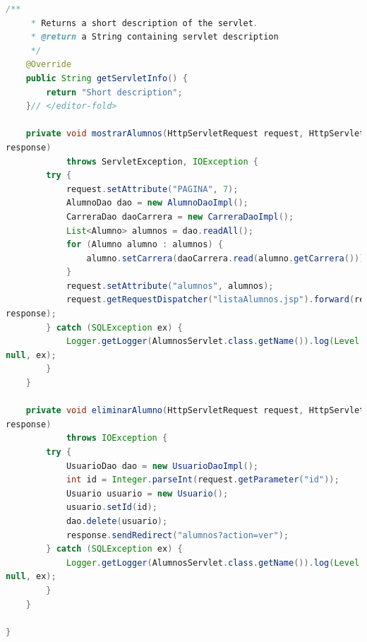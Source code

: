 \documentclass[a4paper,12pt]{article}
\begin{document}
\begin{lstlisting}[language=Java, style=customJava, 
caption={AlumnosServlet.java}, captionpos=b,basicstyle=\fontfamily{cmss}\small]
    /** 
     * Returns a short description of the servlet.
     * @return a String containing servlet description
     */
    @Override
    public String getServletInfo() {
        return "Short description";
    }// </editor-fold>

    private void mostrarAlumnos(HttpServletRequest request, HttpServletResponse 
response) 
            throws ServletException, IOException {
        try {
            request.setAttribute("PAGINA", 7);
            AlumnoDao dao = new AlumnoDaoImpl();
            CarreraDao daoCarrera = new CarreraDaoImpl();
            List<Alumno> alumnos = dao.readAll();
            for (Alumno alumno : alumnos) {
                alumno.setCarrera(daoCarrera.read(alumno.getCarrera()));
            }
            request.setAttribute("alumnos", alumnos);
            request.getRequestDispatcher("listaAlumnos.jsp").forward(request, 
response);
        } catch (SQLException ex) {
            Logger.getLogger(AlumnosServlet.class.getName()).log(Level.SEVERE, 
null, ex);
        }
    }

    private void eliminarAlumno(HttpServletRequest request, HttpServletResponse 
response) 
            throws IOException {
        try {
            UsuarioDao dao = new UsuarioDaoImpl();
            int id = Integer.parseInt(request.getParameter("id"));
            Usuario usuario = new Usuario();
            usuario.setId(id);
            dao.delete(usuario);
            response.sendRedirect("alumnos?action=ver");
        } catch (SQLException ex) {
            Logger.getLogger(AlumnosServlet.class.getName()).log(Level.SEVERE, 
null, ex);
        }
    }

}
\end{lstlisting}
\end{document}

